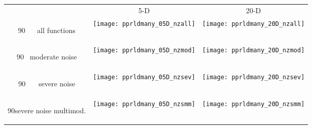 \documentclass[sigconf]{acmart}
\newcommand{\rot}[2][2.5]{
  \hspace*{-3.5\baselineskip}%
  \begin{rotate}{90}\hspace{#1em}#2
  \end{rotate}}
\begin{document}
{%


\begin{figure*}
   \begin{tabular}{@{}c@{}c@{}c@{}}
      \,\, & 5-D & 20-D\\
			\rot{\Large\sffamily \,\,\,\,\,\,\,\,\,\,all functions}\hspace{1em} &
			   \texttt{[image: pprldmany\_05D\_nzall]} &
			   \texttt{[image: pprldmany\_20D\_nzall]}\\[1em]
			\rot{\Large\sffamily \,\,\,\,\,moderate noise}\hspace{1em} &
			   \texttt{[image: pprldmany\_05D\_nzmod]} &
			   \texttt{[image: pprldmany\_20D\_nzmod]}\\[1em]
			\rot{\Large\sffamily \,\,\,\,\,\,\,\,\,\,\,severe noise}\hspace{1em} &
			   \texttt{[image: pprldmany\_05D\_nzsev]} &
			   \texttt{[image: pprldmany\_20D\_nzsev]}\\[1em]
			\rot{\Large\sffamily \!\!severe noise multimod.}\hspace{1em} &
			   \texttt{[image: pprldmany\_05D\_nzsmm]} &
			   \texttt{[image: pprldmany\_20D\_nzsmm]}
    \end{tabular}
\caption{\label{fig:ECDFs} }
\end{figure*}




}
\end{document}
